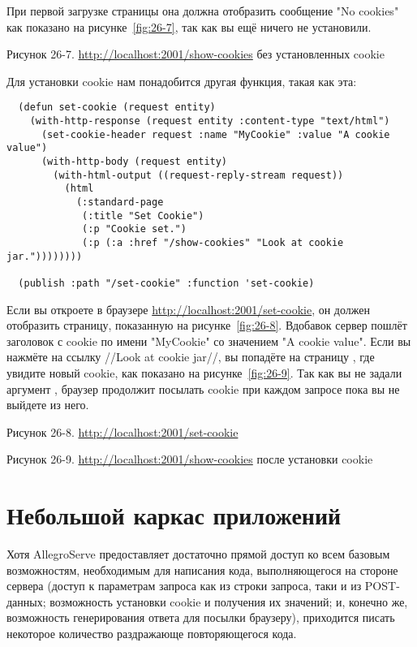 При первой загрузке страницы  она должна
отобразить сообщение "No cookies" как показано на рисунке~\ref{fig:26-7}, так как вы ещё ничего не
установили.

Рисунок 26-7. \url{http://localhost:2001/show-cookies} без установленных cookie

Для установки cookie нам понадобится другая функция, такая как эта:

\begin{lstlisting}
  (defun set-cookie (request entity)
    (with-http-response (request entity :content-type "text/html")
      (set-cookie-header request :name "MyCookie" :value "A cookie value")
      (with-http-body (request entity)
        (with-html-output ((request-reply-stream request))
          (html 
            (:standard-page
             (:title "Set Cookie")
             (:p "Cookie set.")
             (:p (:a :href "/show-cookies" "Look at cookie jar."))))))))

  (publish :path "/set-cookie" :function 'set-cookie)
\end{lstlisting}

Если вы откроете в браузере \url{http://localhost:2001/set-cookie}, он должен отобразить
страницу, показанную на рисунке~\ref{fig:26-8}. Вдобавок сервер пошлёт заголовок
 с cookie по имени "MyCookie" со значением "A cookie value". Если вы
нажмёте на ссылку //Look at cookie jar//, вы попадёте на страницу ,
где увидите новый cookie, как показано на рисунке~\ref{fig:26-9}. Так как вы не задали
аргумент , браузер продолжит посылать cookie при каждом запросе пока вы не
выйдете из него.

Рисунок 26-8. \url{http://localhost:2001/set-cookie}

Рисунок 26-9. \url{http://localhost:2001/show-cookies} после установки cookie

\section{Небольшой каркас приложений}

Хотя AllegroServe предоставляет достаточно прямой доступ ко всем базовым возможностям,
необходимым для написания кода, выполняющегося на стороне сервера (доступ к параметрам
запроса как из строки запроса, таки и из POST-данных; возможность установки cookie и
получения их значений; и, конечно же, возможность генерирования ответа для посылки
браузеру), приходится писать некоторое количество раздражающе повторяющегося кода.

